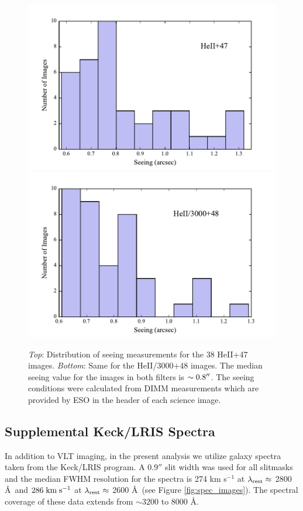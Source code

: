 \documentclass[trackchanges,twocolumn]{aastex62}
\def \mkms {{\rm \; km\;s^{-1}}}
\begin{document}
\begin{figure}[h]
\centering
\includegraphics[scale=.55]{figure3a.pdf}
\includegraphics[scale=.55]{figure3b.pdf}
\caption{\emph{Top}: Distribution of seeing measurements for the 38 HeII+47 images.
\emph{Bottom}: Same for the HeII/3000+48 images. The median seeing value for the images in both filters is $\sim 0.8\mbox{$^{\prime\prime}$}$. 
The seeing conditions were calculated from DIMM measurements which are provided by ESO in the header of each science image.
\label{fig.seeing}}
\end{figure}

\subsection{Supplemental Keck/LRIS Spectra}
In addition to VLT imaging, in the present analysis we utilize galaxy spectra taken from the \cite{Rubin_2014} Keck/LRIS program.  A $0.9''$ slit width was used for all slitmasks and the median FWHM resolution for the spectra is 274 km s$^{-1}$ at $\lambda_{\rm rest} \approx$ 2800 \AA\ and $286\mkms$  at $\lambda_{\rm rest}\approx$ 2600 \AA\ (see Figure \ref{fig:spec_images}).  The spectral coverage of these data extends from ${\sim}3200$ to 8000 \AA.
\end{document}
